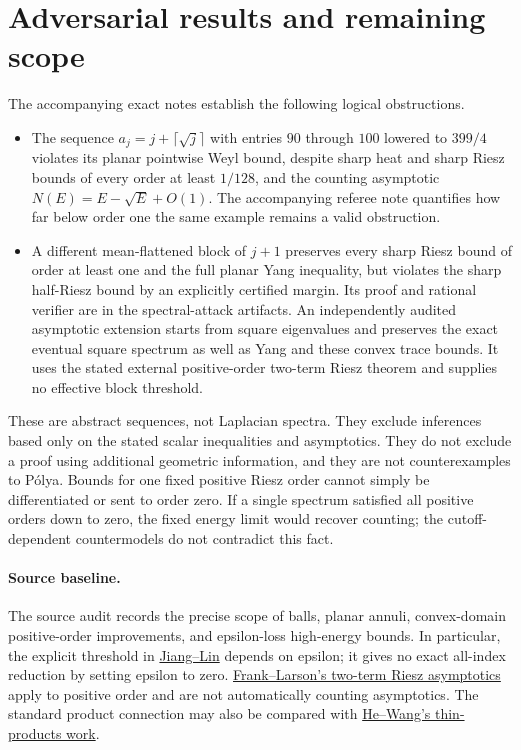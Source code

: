 \documentclass[11pt]{article}
\begin{document}
\section{Adversarial results and remaining scope}
The accompanying exact notes establish the following logical obstructions.
\begin{itemize}
\item The sequence $a_j=j+\lceil\sqrt j\rceil$ with entries $90$ through
$100$ lowered to $399/4$ violates its planar pointwise Weyl bound, despite
sharp heat and sharp Riesz bounds of every order at least $1/128$, and the counting asymptotic
$N(E)=E-\sqrt E+O(1)$. The accompanying referee note quantifies how far
below order one the same example remains a valid obstruction.
\item A different mean-flattened block of $j+1$ preserves every sharp
Riesz bound of order at least one and the full planar Yang inequality,
but violates the sharp half-Riesz bound by an explicitly certified margin.
Its proof and rational verifier are in the spectral-attack artifacts.
An independently audited asymptotic extension starts from square eigenvalues
and preserves the exact eventual square spectrum as well as Yang and these
convex trace bounds. It uses the stated external positive-order two-term
Riesz theorem and supplies no effective block threshold.
\end{itemize}
These are abstract sequences, not Laplacian spectra. They exclude
inferences based only on the stated scalar inequalities and asymptotics.
They do not exclude a proof using additional geometric information, and
they are not counterexamples to P\'olya. Bounds for one fixed positive
Riesz order cannot simply be differentiated or sent to order zero. If a
single spectrum satisfied all positive orders down to zero, the fixed
energy limit would recover counting; the cutoff-dependent countermodels
do not contradict this fact.

\paragraph{Source baseline.}
The source audit records the precise scope of balls, planar annuli,
convex-domain positive-order improvements, and epsilon-loss high-energy
bounds. In particular, the explicit threshold in
\href{https://arxiv.org/abs/2507.04307}{Jiang--Lin} depends on epsilon;
it gives no exact all-index reduction by setting epsilon to zero.
\href{https://arxiv.org/abs/2407.11808}{Frank--Larson's two-term Riesz
asymptotics} apply to positive order and are not automatically counting
asymptotics. The standard product connection may also be compared with
\href{https://arxiv.org/abs/2402.12093}{He--Wang's thin-products work}.
\end{document}

